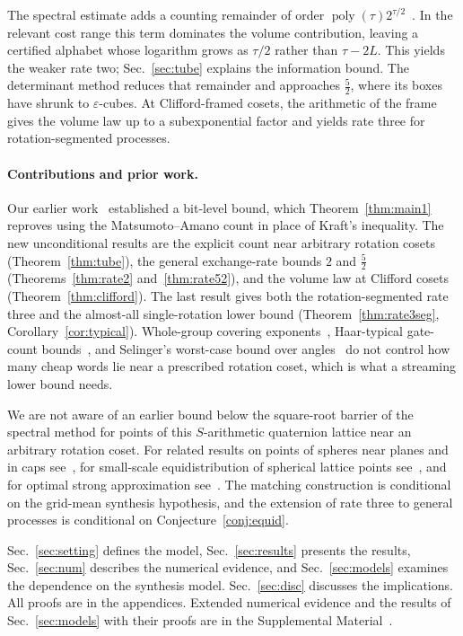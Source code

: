 \documentclass[aps,prx,twocolumn,superscriptaddress,nofootinbib,longbibliography]{revtex4-2}
\theoremstyle{plain}
\theoremstyle{definition}
\theoremstyle{remark}
\begin{document}
The spectral estimate adds a counting remainder of order $\operatorname{poly}(\tau)2^{\tau/2}$~\cite{LPS,LPSII,PS18}. In the relevant cost range this term dominates the volume contribution, leaving a certified alphabet whose logarithm grows as $\tau/2$ rather than $\tau-2L$. This yields the weaker rate two; Sec.~\ref{sec:tube} explains the information bound. The determinant method reduces that remainder and approaches $\tfrac52$, where its boxes have shrunk to $\varepsilon$-cubes. At Clifford-framed cosets, the arithmetic of the frame gives the volume law up to a subexponential factor and yields rate three for rotation-segmented processes.



\paragraph{Contributions and prior work.} Our earlier work~\cite{Paper1} established a bit-level bound, which Theorem~\ref{thm:main1} reproves using the Matsumoto--Amano count in place of Kraft's inequality. The new unconditional results are the explicit count near arbitrary rotation cosets (Theorem~\ref{thm:tube}), the general exchange-rate bounds $2$ and $\tfrac52$ (Theorems~\ref{thm:rate2} and~\ref{thm:rate52}), and the volume law at Clifford cosets (Theorem~\ref{thm:clifford}). The last result gives both the rotation-segmented rate three and the almost-all single-rotation lower bound (Theorem~\ref{thm:rate3seg}, Corollary~\ref{cor:typical}). Whole-group covering exponents~\cite{PS18}, Haar-typical gate-count bounds~\cite{SMA}, and Selinger's worst-case bound over angles~\cite[Thm.~30]{Selinger15} do not control how many cheap words lie near a prescribed rotation coset, which is what a streaming lower bound needs.

We are not aware of an earlier bound below the square-root barrier of the spectral method for points of this $S$-arithmetic quaternion lattice near an arbitrary rotation coset. For related results on points of spheres near planes and in caps see~\cite{BourgainRudnick}, for small-scale equidistribution of spherical lattice points see~\cite{HumphriesRadziwill}, and for optimal strong approximation see~\cite{BKS,Sardari}. The matching construction is conditional on the grid-mean synthesis hypothesis, and the extension of rate three to general processes is conditional on Conjecture~\ref{conj:equid}.

Sec.~\ref{sec:setting} defines the model, Sec.~\ref{sec:results} presents the results, Sec.~\ref{sec:num} describes the numerical evidence, and Sec.~\ref{sec:models} examines the dependence on the synthesis model. Sec.~\ref{sec:disc} discusses the implications. All proofs are in the appendices. Extended numerical evidence and the results of Sec.~\ref{sec:models} with their proofs are in the Supplemental Material~\cite{SM}.
\end{document}

